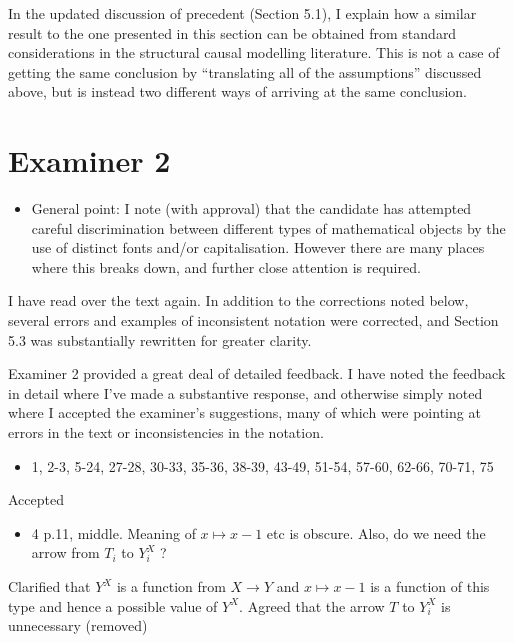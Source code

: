\documentclass[12pt, a4paper]{article}
\begin{document}
In the updated discussion of precedent (Section 5.1), I explain how a similar result to the one presented in this section can be obtained from standard considerations in the structural causal modelling literature. This is not a case of getting the same conclusion by ``translating all of the assumptions'' discussed above, but is instead two different ways of arriving at the same conclusion.

\section{Examiner 2}

\begin{itemize}
    \item General point: I note (with approval) that the candidate has attempted careful discrimination between different types of mathematical objects by the use of distinct fonts and/or capitalisation. However there are many places where this breaks down, and further close attention is required.
\end{itemize}

I have read over the text again. In addition to the corrections noted below, several errors and examples of inconsistent notation were corrected, and Section 5.3 was substantially rewritten for greater clarity.

Examiner 2 provided a great deal of detailed feedback. I have noted the feedback in detail where I've made a substantive response, and otherwise simply noted where I accepted the examiner's suggestions, many of which were pointing at errors in the text or inconsistencies in the notation.    

\begin{itemize}
    \item 1, 2-3, 5-24, 27-28, 30-33, 35-36, 38-39, 43-49, 51-54, 57-60, 62-66, 70-71, 75
\end{itemize}

Accepted

\begin{itemize}
    \item 4 p.11, middle. Meaning of $x \mapsto x − 1$ etc is obscure. Also, do we need the arrow from $T_i$ to $Y_i^X$ ?
\end{itemize}

Clarified that $Y^X$ is a function from $X\to Y$ and $x\mapsto x-1$ is a function of this type and hence a possible value of $Y^X$. Agreed that the arrow $T$ to $Y^X_i$ is unnecessary (removed)
\end{document}
